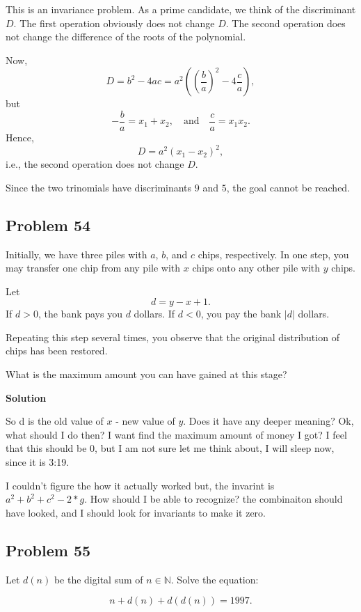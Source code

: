 \documentclass[12pt,tikz,border=10pt]{article}
\theoremstyle{definition}
\theoremstyle{remark}
\begin{document}
This is an invariance problem. As a prime candidate, we think of the discriminant \( D \). 
The first operation obviously does not change \( D \). The second operation does not change 
the difference of the roots of the polynomial.

Now, 
\[
D = b^2 - 4ac = a^2 \left( \left( \frac{b}{a} \right)^2 - 4 \frac{c}{a} \right),
\]
but 
\[
-\frac{b}{a} = x_1 + x_2, \quad \text{and} \quad \frac{c}{a} = x_1 x_2.
\]
Hence, 
\[
D = a^2 (x_1 - x_2)^2,
\]
i.e., the second operation does not change \( D \). 

Since the two trinomials have discriminants \( 9 \) and \( 5 \), the goal cannot be reached.

\subsection{Problem 54}

Initially, we have three piles with \( a \), \( b \), and \( c \) chips, respectively. In one step, you may 
transfer one chip from any pile with \( x \) chips onto any other pile with \( y \) chips. 

Let 
\[
d = y - x + 1.
\]
If \( d > 0 \), the bank pays you \( d \) dollars. If \( d < 0 \), you pay the bank \( |d| \) dollars. 

Repeating this step several times, you observe that the original distribution of chips has been restored. 

What is the maximum amount you can have gained at this stage?

\textbf{Solution}

So d is the old value of $x$ - new value of $y$. Does it have any deeper meaning?
Ok, what should I do then? I want find the maximum amount of money I got? I feel that this should be 0, 
but I am not sure let me think about, I will sleep now, since it is 3:19.

I couldn't figure the how it actually worked but, the invarint is $a^2 + b^2+ c^2- 2*g$. How should I be 
able to recognize? the combinaiton should have looked, and I should look for invariants to make it zero.

\subsection{Problem 55}


Let \( d(n) \) be the digital sum of \( n \in \mathbb{N} \). Solve the equation:

\[
n + d(n) + d(d(n)) = 1997.
\]
\end{document}
